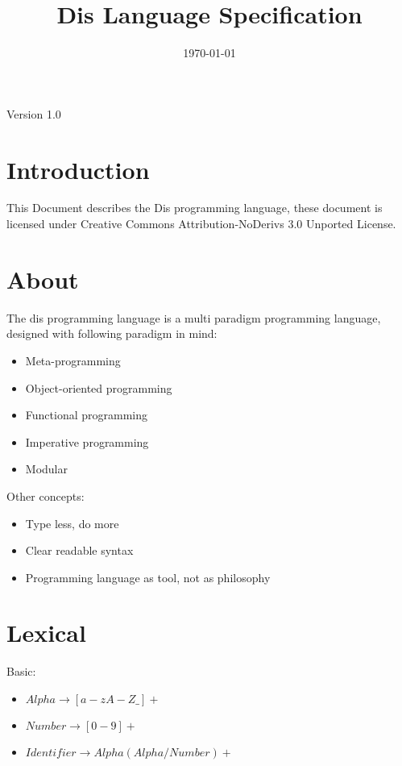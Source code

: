 \documentclass[a4paper]{article}
\title{Dis Language Specification}
\date{\today}
\author{}
\begin{document}
\maketitle
\begin{center}
Version 1.0
\end{center}

\newpage
\tableofcontents
\newpage

\section{Introduction}
This Document describes the Dis programming language, these document is licensed under Creative Commons Attribution-NoDerivs 3.0 Unported License.

\section{About}
The dis programming language is a multi paradigm programming language, designed with following paradigm in mind:
\begin{itemize}
\item Meta-programming
\item Object-oriented programming
\item Functional programming
\item Imperative programming
\item Modular
\end{itemize}

Other concepts:
\begin{itemize}
\item Type less, do more
\item Clear readable syntax
\item Programming language as tool, not as philosophy
\end{itemize}

\section{Lexical}
Basic:

\begin{itemize}
\item $Alpha \rightarrow [a-zA-Z\_]+$
\item $Number \rightarrow [0-9]+$
\item $Identifier \rightarrow Alpha (Alpha / Number)+$
\end{itemize}
\end{document}
